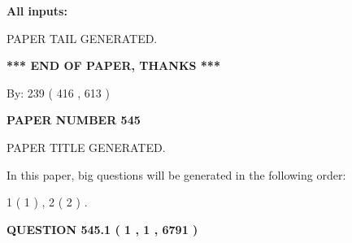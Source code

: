 \documentclass{ctexart}
\begin{document}
   
   
   
\noindent{}
   
   
   
   
\noindent\vspace{0.1in}\hspace{-0.08in} {\textbf{\Large{All inputs: }}}
   
   
   
   
   
   
 \vspace{0.2in}
 
   
   
\vspace{2.0in} PAPER TAIL GENERATED.
   
   
   
   
\vspace{1.0in} 
{\textbf{\large{ *** END OF PAPER, THANKS *** }}} 
   
   
\hspace{1.0in} By: 
 239 ( 416 ,  613 )
   
   
   
   
\newpage 
\setcounter{page}{ 
   545001 } 
   
   
   
   
 {\textbf{ \Large{ PAPER NUMBER  545  }}}
   
   
\vspace{0.2in}
   
   
   
   
   
   
   
   
 \vspace{0.2in}
 
 
 
 
   
   
 PAPER TITLE GENERATED.
   
   
   
\vspace{0.2in}
   
In this paper, big questions will be generated in the following order: 
   
   
   1 ( 1 )
 ,
   2 ( 2 )
 .
  
\vspace{0.2in}
  
{\textbf{\Large{QUESTION
545.1 
 ( 1 , 1 , 6791 )
}}}
  
\end{document}
